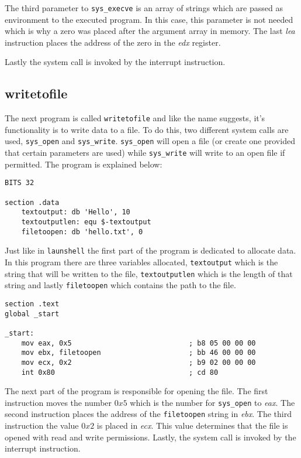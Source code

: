 \documentclass[11pt,twoside]{eitExjobb}
\begin{document}
The third parameter to \texttt{sys\_execve} is an array of strings which are passed as environment to the executed program. In this case, this parameter is not needed which is why a zero was placed after the argument array in memory. The last \emph{lea} instruction places the address of the zero in the \emph{edx} register.

Lastly the system call is invoked by the interrupt instruction.



\subsection{writetofile}
The next program is called \texttt{writetofile} and like the name suggests, it's functionality is to write data to a file. To do this, two different system calls are used, \texttt{sys\_open} and \texttt{sys\_write}. \texttt{sys\_open} will open a file (or create one provided that certain parameters are used) while \texttt{sys\_write} will write to an open file if permitted. The program is explained below:

\begin{verbatim}
BITS 32

section .data
    textoutput: db 'Hello', 10
    textoutputlen: equ $-textoutput
    filetoopen: db 'hello.txt', 0
\end{verbatim}

\noindent Just like in \texttt{launshell} the first part of the program is dedicated to allocate data. In this program there are three variables allocated, \texttt{textoutput} which is the string that will be written to the file, \texttt{textoutputlen} which is the length of that string and lastly \texttt{filetoopen} which contains the path to the file.

\begin{verbatim}
section .text
global _start

_start:
    mov eax, 0x5                            ; b8 05 00 00 00
    mov ebx, filetoopen                     ; bb 46 00 00 00
    mov ecx, 0x2                            ; b9 02 00 00 00
    int 0x80                                ; cd 80
\end{verbatim}

\noindent The next part of the program is responsible for opening the file. The first instruction moves the number $0x5$ which is the number for \texttt{sys\_open} to \emph{eax}. The second instruction places the address of the \texttt{filetoopen} string in \emph{ebx}. The third instruction the value $0x2$ is placed in \emph{ecx}. This value determines that the file is opened with read and write permissions. Lastly, the system call is invoked by the interrupt instruction.
\end{document}
